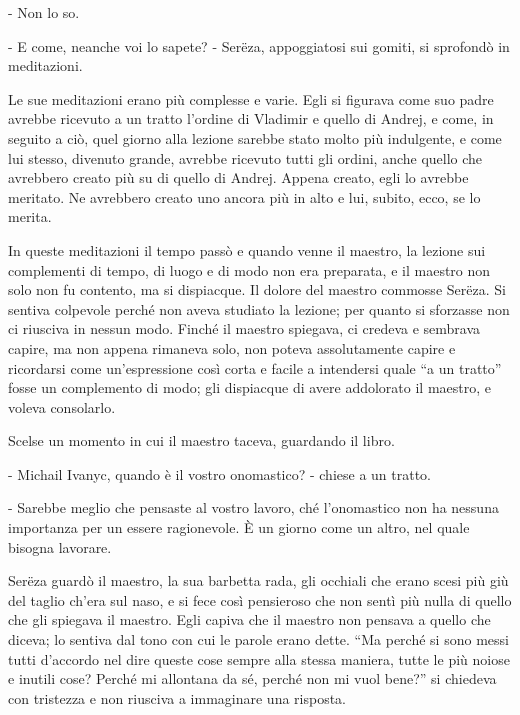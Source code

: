 - Non lo so. 

- E come, neanche voi lo sapete? - Serëza, appoggiatosi sui gomiti, si sprofondò in meditazioni. 

Le sue meditazioni erano più complesse e varie. Egli si figurava come suo padre avrebbe ricevuto a un tratto l'ordine di Vladimir e quello di Andrej, e come, in seguito a ciò, quel giorno alla lezione sarebbe stato molto più indulgente, e come lui stesso, divenuto grande, avrebbe ricevuto tutti gli ordini, anche quello che avrebbero creato più su di quello di Andrej. Appena creato, egli lo avrebbe meritato. Ne avrebbero creato uno ancora più in alto e lui, subito, ecco, se lo merita. 

In queste meditazioni il tempo passò e quando venne il maestro, la lezione sui complementi di tempo, di luogo e di modo non era preparata, e il maestro non solo non fu contento, ma si dispiacque. Il dolore del maestro commosse Serëza. Si sentiva colpevole perché non aveva studiato la lezione; per quanto si sforzasse non ci riusciva in nessun modo. Finché il maestro spiegava, ci credeva e sembrava capire, ma non appena rimaneva solo, non poteva assolutamente capire e ricordarsi come un'espressione così corta e facile a intendersi quale ``a un tratto'' fosse un complemento di modo; gli dispiacque di avere addolorato il maestro, e voleva consolarlo. 

Scelse un momento in cui il maestro taceva, guardando il libro. 

- Michail Ivanyc, quando è il vostro onomastico? - chiese a un tratto. 

- Sarebbe meglio che pensaste al vostro lavoro, ché l'onomastico non ha nessuna importanza per un essere ragionevole. È un giorno come un altro, nel quale bisogna lavorare. 

Serëza guardò il maestro, la sua barbetta rada, gli occhiali che erano scesi più giù del taglio ch'era sul naso, e si fece così pensieroso che non sentì più nulla di quello che gli spiegava il maestro. Egli capiva che il maestro non pensava a quello che diceva; lo sentiva dal tono con cui le parole erano dette. ``Ma perché si sono messi tutti d'accordo nel dire queste cose sempre alla stessa maniera, tutte le più noiose e inutili cose? Perché mi allontana da sé, perché non mi vuol bene?'' si chiedeva con tristezza e non riusciva a immaginare una risposta. 

\label{xxvii-3} 

